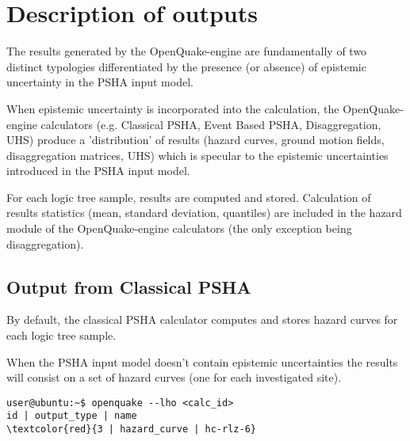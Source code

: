 \section{Description of outputs}
The results generated by the OpenQuake-engine are fundamentally 
of two distinct typologies differentiated by the presence (or 
absence) of epistemic uncertainty in the PSHA input model.

When epistemic uncertainty is incorporated into the 
calculation, the Open\-Quake\--engine calculators (e.g. Classical 
PSHA, Event Based PSHA, Disaggregation, UHS) produce a 
'distribution' of results (hazard curves, ground motion fields, 
disaggregation matrices, UHS) which is specular to the epistemic 
uncertainties introduced in the PSHA input model.

For each logic tree sample, results are computed and stored. 
Calculation of results statistics (mean, standard deviation, 
quantiles) are included in the hazard module of the 
OpenQuake-engine calculators (the only exception being 
disaggregation).
\subsection{Output from Classical PSHA}
By default, the classical PSHA calculator computes and stores 
hazard curves for each logic tree sample.

When the PSHA input model doesn't contain epistemic uncertainties
the results will consist on a set of hazard curves (one for each 
investigated site). 
\begin{Verbatim}[frame=single, commandchars=\\\{\}, fontsize=\small]
user@ubuntu:~$ openquake --lho <calc_id>
id | output_type | name
\textcolor{red}{3 | hazard_curve | hc-rlz-6}
\end{Verbatim}

